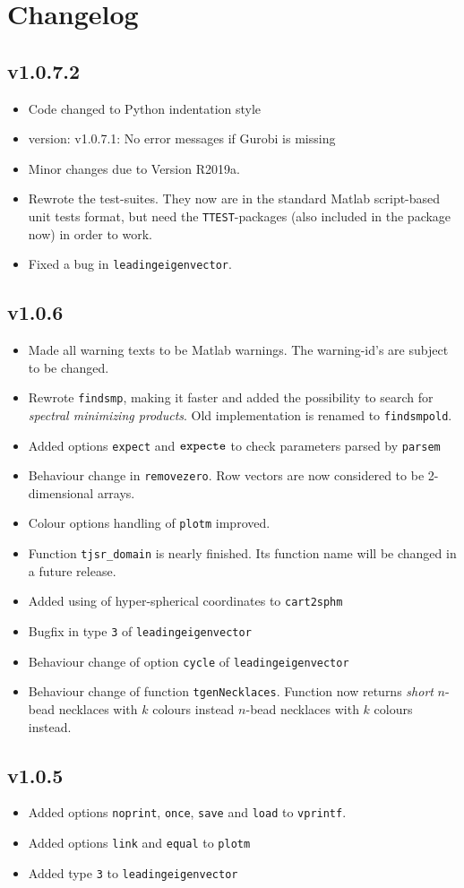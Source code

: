 
\chapter{Changelog}

\section*{v1.0.7.2}
\begin{itemize}
\item Code changed to Python indentation style
\item version: v1.0.7.1: No error messages if Gurobi is missing
\item Minor changes due to Version R2019a.
\item Rewrote the test-suites. They now are in the standard Matlab script-based unit tests format, but need the \texttt{TTEST}-packages (also included in the package now) in order to work.
\item Fixed a bug in \verb|leadingeigenvector|.
\end{itemize}


\section*{v1.0.6}
\begin{itemize}
\item Made all warning texts to be Matlab warnings. The warning-id's are subject to be changed.
\item Rewrote \verb|findsmp|, making it faster and added the possibility to search for \emph{spectral minimizing products}.
Old implementation is renamed to \verb|findsmpold|.
\item Added options \verb|expect| and $\verb|expecte|$ to check parameters parsed by \verb|parsem|
\item Behaviour change in \verb|removezero|. Row vectors are now considered to be 2-dimensional arrays.
\item Colour options handling of \verb|plotm| improved.
\item Function \verb|tjsr_domain| is nearly finished. Its function name will be changed in a future release.
\item Added using of hyper-spherical coordinates to \verb|cart2sphm|
\item Bugfix in type \verb|3| of \verb|leadingeigenvector|
\item Behaviour change of option \verb|cycle| of \verb|leadingeigenvector|
\item Behaviour change of function \verb|tgenNecklaces|. 
Function now returns \emph{short} $n$-bead necklaces with $k$ colours instead
$n$-bead necklaces with $k$ colours instead.

\end{itemize}

\section*{v1.0.5}
\begin{itemize}
\item Added options \verb|noprint|, \verb|once|, \verb|save| and \verb|load| to \verb|vprintf|.
\item Added options \verb|link| and \verb|equal| to \verb|plotm|
\item Added type \verb|3| to \verb|leadingeigenvector|
\end{itemize}